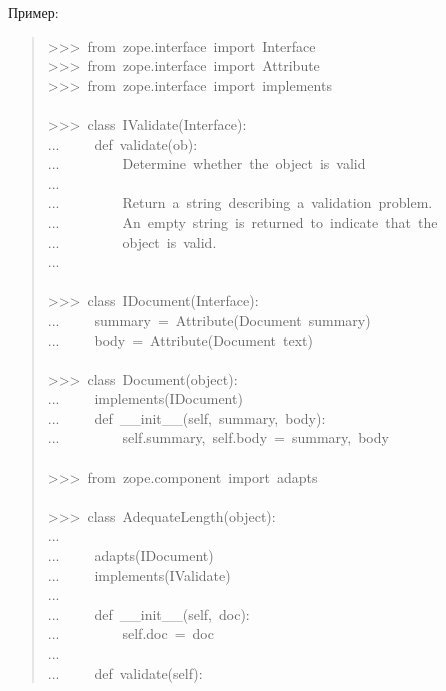 \documentclass[a4paper,openany,twoside,final]{book}
\begin{document}
Пример:

\begin{quote}{\ttfamily \raggedright \noindent
>{}>{}>~from~zope.interface~import~Interface\\
>{}>{}>~from~zope.interface~import~Attribute\\
>{}>{}>~from~zope.interface~import~implements\\
~\\
>{}>{}>~class~IValidate(Interface):\\
...~~~~~def~validate(ob):\\
...~~~~~~~~~\textquotedbl{}\textquotedbl{}\textquotedbl{}Determine~whether~the~object~is~valid\\
...\\
...~~~~~~~~~Return~a~string~describing~a~validation~problem.\\
...~~~~~~~~~An~empty~string~is~returned~to~indicate~that~the\\
...~~~~~~~~~object~is~valid.\\
...~~~~~~~~~\textquotedbl{}\textquotedbl{}\textquotedbl{}\\
~\\
>{}>{}>~class~IDocument(Interface):\\
...~~~~~summary~=~Attribute(\textquotedbl{}Document~summary\textquotedbl{})\\
...~~~~~body~=~Attribute(\textquotedbl{}Document~text\textquotedbl{})\\
~\\
>{}>{}>~class~Document(object):\\
...~~~~~implements(IDocument)\\
...~~~~~def~\_\_init\_\_(self,~summary,~body):\\
...~~~~~~~~~self.summary,~self.body~=~summary,~body\\
~\\
>{}>{}>~from~zope.component~import~adapts\\
~\\
>{}>{}>~class~AdequateLength(object):\\
...\\
...~~~~~adapts(IDocument)\\
...~~~~~implements(IValidate)\\
...\\
...~~~~~def~\_\_init\_\_(self,~doc):\\
...~~~~~~~~~self.doc~=~doc\\
...\\
...~~~~~def~validate(self):\\
}
\end{quote}
\end{document}
